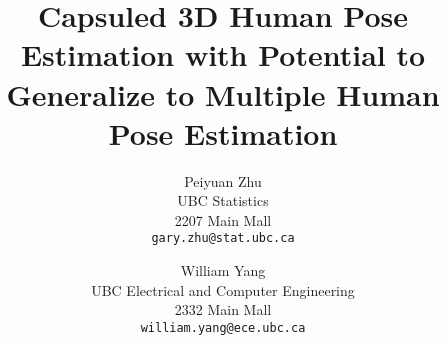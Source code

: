 \documentclass[10pt,twocolumn,letterpaper]{article}
\begin{document}
\title{Capsuled 3D Human Pose Estimation with Potential to Generalize to Multiple Human Pose Estimation}

\author{Peiyuan Zhu\\
UBC Statistics\\
2207 Main Mall\\
{\tt\small gary.zhu@stat.ubc.ca}
\and
William Yang\\
UBC Electrical and Computer Engineering\\
2332 Main Mall\\
{\tt\small william.yang@ece.ubc.ca}
}

\maketitle








{
	
	
}
\end{document}
